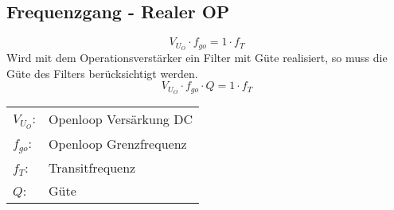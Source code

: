 




\subsection{Frequenzgang - Realer OP}
\[ V_{U_O} \cdot f_{go} = 1 \cdot f_T \]
Wird mit dem Operationsverstärker ein Filter mit Güte realisiert, so 
muss die Güte des Filters berücksichtigt werden. 
\[ V_{U_O} \cdot f_{go} \cdot Q = 1 \cdot f_T \]
\begin{tabular}{@{}ll}
  $V_{U_O}$:    & Openloop Versärkung DC \\
  $f_{go}$:     & Openloop Grenzfrequenz \\   
  $f_T$:        & Transitfrequenz \\
  $Q$:          & Güte \\
\end{tabular}
